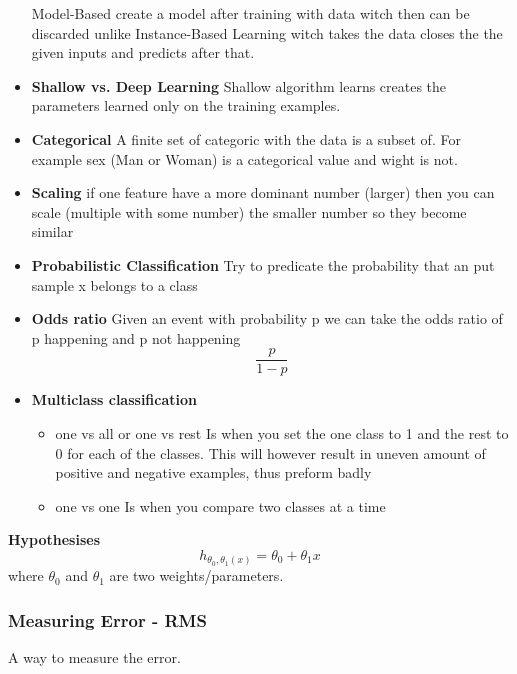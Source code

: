 \documentclass{article}
\begin{document}
\begin{itemize}
    Model-Based create a model after training with data witch then can be discarded unlike 
    Instance-Based Learning witch takes the data closes the the given inputs and predicts after that. 
    \item \textbf{Shallow vs. Deep Learning}
    Shallow algorithm learns creates the parameters learned only on the training examples.
    \item \textbf{Categorical} \newline
    A finite set of categoric with the data is a subset of. For example sex (Man or Woman) is a categorical value and wight is not.
    \item \textbf{Scaling} \newline
    if one feature have a more dominant number (larger) then you can scale (multiple with some number) the smaller number so they become similar
    \item \textbf{Probabilistic Classification} \newline 
    Try to predicate the probability that an put sample x belongs to a class
    \item \textbf{Odds ratio} \newline 
    Given an event with probability p we can take the odds ratio of p happening and p not happening
    \begin{equation*}
        \frac{p}{1-p}
    \end{equation*}
    \item \textbf{Multiclass classification}
    \begin{itemize}
        \item one vs all or one vs rest \newline
        Is when you set the one class to 1 and the rest to 0 for each of the classes. This will however result in uneven amount of positive and negative examples, thus preform badly
        \item one vs one \newline 
        Is when you compare two classes at a time
    \end{itemize}
\end{itemize}

\textbf{Hypothesises}
\begin{equation*}
    h_{\theta_0,\theta_1(x)} = \theta_0 + \theta_1 x
\end{equation*}
where $\theta_0$ and $\theta_1$ are two weights/parameters.

\subsubsection{Measuring Error - RMS}
A way to measure the error.
\end{document}
